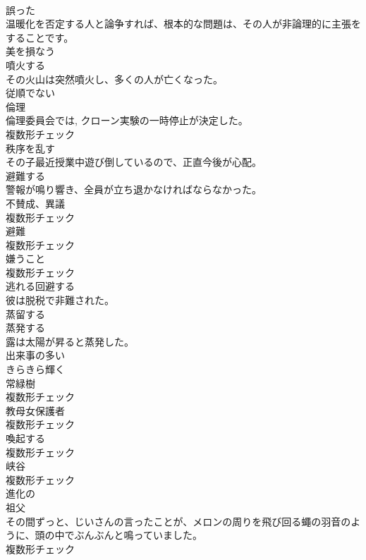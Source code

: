 \documentclass[8pt]{extreport}
\begin{document}
\begin{CJK}{UTF8}{min}
\\	[形容詞]	誤った	
\\	温暖化を否定する人と論争すれば、根本的な問題は、その人が非論理的に主張をすることです。	
\\	[動詞]	美を損なう	
\\	[動詞]	噴火する	
\\	その火山は突然噴火し、多くの人が亡くなった。	
\\	[形容詞]	従順でない	
\\	[名詞]	倫理	
\\	倫理委員会では, クローン実験の一時停止が決定した。	
\\	複数形チェック
\\	[形容詞]	秩序を乱す	
\\	その子最近授業中遊び倒しているので、正直今後が心配。	
\\	[動詞]	避難する	
\\	警報が鳴り響き、全員が立ち退かなければならなかった。	
\\	[名詞]	不賛成、異議	
\\	複数形チェック
\\	[名詞]	避難	
\\	複数形チェック
\\	[名詞]	嫌うこと	
\\	複数形チェック
\\	[動詞]	逃れる回避する	
\\	彼は脱税で非難された。	
\\	[動詞]	蒸留する	
\\	[動詞]	蒸発する	
\\	露は太陽が昇ると蒸発した。	
\\	[形容詞]	出来事の多い	
\\	[動詞]	きらきら輝く	
\\	[名詞]	常緑樹	
\\	複数形チェック
\\	[名詞]	教母女保護者	
\\	複数形チェック
\\	[名詞]	喚起する	
\\	複数形チェック
\\	[名詞]	峡谷	
\\	複数形チェック
\\	[形容詞]	進化の	
\\	[名詞]	祖父	
\\	その間ずっと、じいさんの言ったことが、メロンの周りを飛び回る蠅の羽音のように、頭の中でぶんぶんと鳴っていました。	
\\	複数形チェック

\end{CJK}
\end{document}
